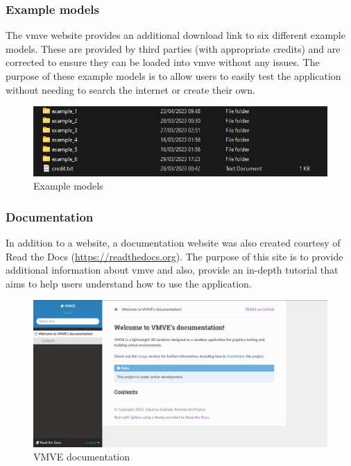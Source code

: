 \documentclass[11pt]{article}
\begin{document}
\subsubsection{Example models}
The \gls*{vmve} website provides an additional download link to six different
example models. These are provided by third parties (with appropriate credits)
and are corrected to ensure they can be loaded into \gls*{vmve} without any
issues. The purpose of these example models is to allow users to easily test the
application without needing to search the internet or create their own.

\begin{figure}[H]
  \centering
  \includegraphics[width=\textwidth]{images/example_models.png}
  \caption{Example models}
  \label{fig:example_models}
\end{figure}

\subsubsection{Documentation}
In addition to a website, a documentation website was also created courtesy of
Read the Docs (\href{https://readthedocs.org}{https://readthedocs.org}). The
purpose of this site is to provide additional information about \gls*{vmve} and
also, provide an in-depth tutorial that aims to help users understand how to use
the application.

\begin{figure}[H]
  \centering
  \includegraphics[width=\textwidth]{images/documentation.png}
  \caption{VMVE documentation}
  \label{fig:documentation}
\end{figure}
\end{document}
